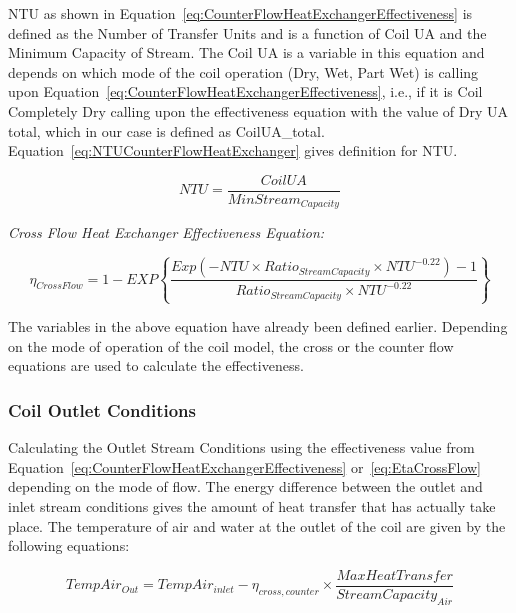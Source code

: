 NTU as shown in Equation~\ref{eq:CounterFlowHeatExchangerEffectiveness} is defined as the Number of Transfer Units and is a function of Coil UA and the Minimum Capacity of Stream. The Coil UA is a variable in this equation and depends on which mode of the coil operation (Dry, Wet, Part Wet) is calling upon Equation~\ref{eq:CounterFlowHeatExchangerEffectiveness}, i.e., if it is Coil Completely Dry calling upon the effectiveness equation with the value of Dry UA total, which in our case is defined as CoilUA\_total. Equation~\ref{eq:NTUCounterFlowHeatExchanger} gives definition for NTU.

\begin{equation}
NTU = \frac{{CoilUA}}{{MinStrea{m_{Capacity}}}}
\label{eq:NTUCounterFlowHeatExchanger}
\end{equation}

\emph{Cross Flow Heat Exchanger Effectiveness Equation:}

\begin{equation}
{\eta_{CrossFlow}} = 1 - EXP\left\{ {\frac{{Exp( - NTU \times Rati{o_{StreamCapacity}} \times NT{U^{ - 0.22}}) - 1}}{{Rati{o_{StreamCapacity}} \times NT{U^{ - 0.22}}}}} \right\}
\label{eq:EtaCrossFlow}
\end{equation}

The variables in the above equation have already been defined earlier. Depending on the mode of operation of the coil model, the cross or the counter flow equations are used to calculate the effectiveness.

\subsubsection{Coil Outlet Conditions}\label{coil-outlet-conditions}

Calculating the Outlet Stream Conditions using the effectiveness value from Equation~\ref{eq:CounterFlowHeatExchangerEffectiveness} or~\ref{eq:EtaCrossFlow} depending on the mode of flow. The energy difference between the outlet and inlet stream conditions gives the amount of heat transfer that has actually take place. The temperature of air and water at the outlet of the coil are given by the following equations:

\begin{equation}
TempAi{r_{Out}} = TempAi{r_{inlet}} - {\eta_{cross,counter}} \times \frac{{MaxHeatTransfer}}{{StreamCapacit{y_{Air}}}}
\label{eq:HeatExchangerOutAirTemp}
\end{equation}

